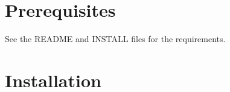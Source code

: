 \section{Prerequisites}

See the README and INSTALL files for the requirements.

\section{Installation}

